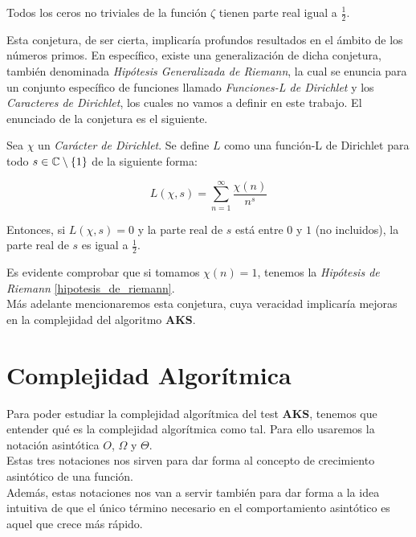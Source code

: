 \begin{conjetura}\label{hipotesis_de_riemann}
	Todos los ceros no triviales de la función $\zeta$ tienen parte real igual a $\frac{1}{2}$.
\end{conjetura}

Esta conjetura, de ser cierta, implicaría profundos resultados en el ámbito de los números primos. En específico, existe una generalización de dicha conjetura, también denominada \textit{Hipótesis Generalizada de Riemann}, la cual se enuncia para un conjunto específico de funciones llamado \textit{Funciones-L de Dirichlet} y los \textit{Caracteres de Dirichlet}, los cuales no vamos a definir en este trabajo. El enunciado de la conjetura es el siguiente.

\begin{conjetura}\label{hipotesis_generalizada_de_riemann}
	Sea $\chi$ un \textit{Carácter de Dirichlet}. Se define $L$ como una función-L de Dirichlet para todo $s \in \mathbb{C} \setminus \{1\}$ de la siguiente forma:
	
	\begin{equation}
	L(\chi, s) = \sum_{n=1}^{\infty}\frac{\chi(n)}{n^s}
	\end{equation}
	
	Entonces, si $L(\chi, s) = 0$ y la parte real de $s$ está entre $0$ y $1$ (no incluidos), la parte real de $s$ es igual a $\frac{1}{2}$.
\end{conjetura}

Es evidente comprobar que si tomamos $\chi(n) = 1$, tenemos la \textit{Hipótesis de Riemann} \ref{hipotesis_de_riemann}.\\

Más adelante mencionaremos esta conjetura, cuya veracidad implicaría mejoras en la complejidad del algoritmo \textbf{AKS}.

\section{Complejidad Algorítmica}

Para poder estudiar la complejidad algorítmica del test \textbf{AKS}, tenemos que entender qué es la complejidad algorítmica como tal. Para ello usaremos la notación asintótica $O$, $\Omega$ y $\Theta$.\\

Estas tres notaciones nos sirven para dar forma al concepto de crecimiento asintótico de una función.\\

Además, estas notaciones nos van a servir también para dar forma a la idea intuitiva de que el único término necesario en el comportamiento asintótico es aquel que crece más rápido.

